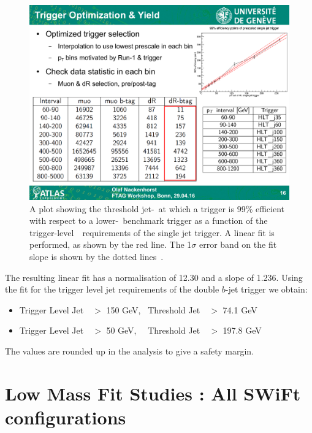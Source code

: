 \begin{figure}[!hbt]
    \begin{center}
        \includegraphics[width=0.6\linewidth, angle=0]{figs/Dibjet/LowMass/jetTriggerTurnOn.pdf}
      \end{center}
  \caption[A plot showing the threshold jet-\pT~at which a trigger is 99\% efficient
             with respect to a lower-\pT~benchmark trigger as a function of the trigger-level~\pT~requirements of the single jet trigger.
             A linear fit is performed, as shown by the red line. The 1$\sigma$ error band on the fit slope is shown by the dotted lines.]
           {A plot showing the threshold jet-\pT~at which a trigger is 99\% efficient
             with respect to a lower-\pT~benchmark trigger as a function of the trigger-level~\pT~requirements of the single jet trigger.
             A linear fit is performed, as shown by the red line. The 1$\sigma$ error band on the fit slope is shown by the dotted lines~\cite{evt-jet_turnOnFit}.}
          \label{fig:triggerTurnOn_fit}
\end{figure}

\noindent
The resulting linear fit has a normalisation of 12.30 and a slope of 1.236.
Using the fit for the trigger level jet requirements of the double $b$-jet trigger we obtain:
\vspace{-0.5em}
\begin{itemize}[leftmargin=*]
\item Trigger Level Jet~\pT~$>$ 150 GeV,~  Threshold Jet~\pT~$>$ 74.1 GeV 
\item Trigger Level Jet~\pT~$>$  50 GeV,~~ Threshold Jet~\pT~$>$ 197.8 GeV
\end{itemize}
\vspace{-0.3em}
\noindent
The values are rounded up in the analysis to give a safety margin.

\chapter{Low Mass Fit Studies : All SWiFt configurations}
\label{app:lowMass_Swift}

